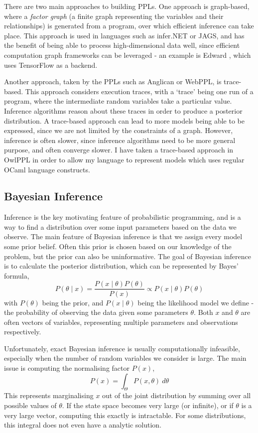 There are two main approaches to building PPLs. One approach is graph-based, where a \textit{factor graph} (a finite graph representing the variables and their relationships) is generated from a program, over which efficient inference can take place. This approach is used in languages such as infer.NET or JAGS, and has the benefit of being able to process high-dimensional data well, since efficient computation graph frameworks can be leveraged - an example is Edward \cite{edward}, which uses TensorFlow as a backend.
	
Another approach, taken by the PPLs such as Anglican or WebPPL, is trace-based. This approach considers execution traces, with a `trace' being one run of a program, where the intermediate random variables take a particular value. Inference algorithms reason about these traces in order to produce a posterior distribution. A trace-based approach can lead to more models being able to be expressed, since we are not limited by the constraints of a graph. However, inference is often slower, since inference algorithms need to be more general purpose, and often converge slower. I have taken a trace-based approach in OwlPPL in order to allow my language to represent models which uses regular OCaml language constructs.
		
\subsection{Bayesian Inference}
Inference is the key motivating feature of probabilistic programming, and is a way to find a distribution over some input parameters based on the data we observe. The main feature of Bayesian inference is that we assign every model some prior belief. Often this prior is chosen based on our knowledge of the problem, but the prior can also be uninformative. The goal of Bayesian inference is to calculate the posterior distribution, which can be represented by Bayes' formula,
% 
\[P(\theta\mid x)=\frac{P(x\mid\theta)P(\theta)}{P(x)}\propto{{P(x\mid\theta)P(\theta)}} \]
% 
with $P(\theta)$ being the prior, and $P(x\mid \theta)$ being the likelihood model we define - the probability of observing the data given some parameters $\theta$. Both $x$ and $\theta$ are often vectors of variables, representing multiple parameters and observations respectively.
	
Unfortunately, exact Bayesian inference is usually computationally infeasible, especially when the number of random variables  we consider is large. The main issue is computing the normalising factor $P(x)$,
\[P(x)=\int_{\Theta}P(x,\theta)~d\theta\]
This represents marginalising $x$ out of the joint distribution by summing over all possible values of $\theta$. If the state space becomes very large (or infinite), or if $\theta$ is a very large vector, computing this exactly is intractable. For some distributions, this integral does not even have a analytic solution.

